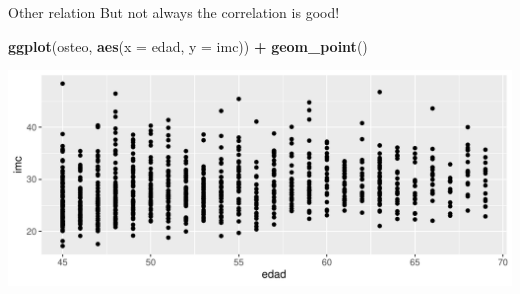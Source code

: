 \documentclass[
  ignorenonframetext,
]{beamer}
\newenvironment{Shaded}{\begin{snugshade}}{\end{snugshade}}
\newcommand{\AttributeTok}[1]{\textcolor[rgb]{0.13,0.29,0.53}{#1}}
\newcommand{\FunctionTok}[1]{\textcolor[rgb]{0.13,0.29,0.53}{\textbf{#1}}}
\newcommand{\NormalTok}[1]{#1}
\newcommand{\SpecialCharTok}[1]{\textcolor[rgb]{0.81,0.36,0.00}{\textbf{#1}}}
\begin{document}
\begin{frame}[fragile]{Other relation}
\label{other-relation}
But not always the correlation is good!

\begin{Shaded}
\begin{Highlighting}[]
\FunctionTok{ggplot}\NormalTok{(osteo, }\FunctionTok{aes}\NormalTok{(}\AttributeTok{x =}\NormalTok{ edad, }\AttributeTok{y =}\NormalTok{ imc)) }\SpecialCharTok{+}
  \FunctionTok{geom\_point}\NormalTok{()}
\end{Highlighting}
\end{Shaded}

\includegraphics{StatisticsWithR-3-Exploratory_Analysis_II_And_Graphics_files/figure-beamer/unnamed-chunk-18-1.pdf}
\end{frame}
\end{document}
